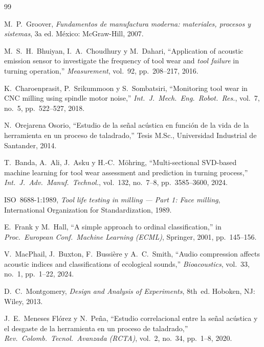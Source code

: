 \documentclass[10pt,twocolumn]{article}
\begin{document}
\begin{thebibliography}{99}

M.~P.~Groover, \textit{Fundamentos de manufactura moderna: materiales,
procesos y sistemas}, 3a ed. México: McGraw-Hill, 2007.

M.~S.~H.~Bhuiyan, I.~A.~Choudhury y M.~Dahari, ``Application of acoustic
emission sensor to investigate the frequency of tool wear and
\textit{tool failure} in turning operation,'' \textit{Measurement},
vol.~92, pp.~208--217, 2016.

K.~Charoenprasit, P.~Srikummoon y S.~Sombatsiri, ``Monitoring tool wear
in CNC milling using spindle motor noise,'' \textit{Int.\ J.\ Mech.\
Eng.\ Robot.\ Res.}, vol.~7, no.~5, pp.~522--527, 2018.

N.~Orejarena Osorio, ``Estudio de la señal acústica en función de la
vida de la herramienta en un proceso de taladrado,'' Tesis M.Sc.,
Universidad Industrial de Santander, 2014.

T.~Banda, A.~Ali, J.~Asku y H.-C.~Möhring, ``Multi-sectional SVD-based
machine learning for tool wear assessment and prediction in turning
process,'' \textit{Int.\ J.\ Adv.\ Manuf.\ Technol.}, vol.~132,
no.~7--8, pp.~3585--3600, 2024.

ISO~8688-1:1989, \textit{Tool life testing in milling --- Part 1: Face
milling}, International Organization for Standardization, 1989.

E.~Frank y M.~Hall, ``A simple approach to ordinal classification,'' in
\textit{Proc.\ European Conf.\ Machine Learning (ECML)}, Springer,
2001, pp.~145--156.

V.~MacPhail, J.~Buxton, F.~Bussière y A.~C.~Smith, ``Audio compression
affects acoustic indices and classifications of ecological sounds,''
\textit{Bioacoustics}, vol.~33, no.~1, pp.~1--22, 2024.

D.~C.~Montgomery, \textit{Design and Analysis of Experiments}, 8th~ed.
Hoboken, NJ: Wiley, 2013.

J.~E.~Meneses Flórez y N.~Peña, ``Estudio correlacional entre la señal
acústica y el desgaste de la herramienta en un proceso de taladrado,''
\textit{Rev.\ Colomb.\ Tecnol.\ Avanzada (RCTA)}, vol.~2, no.~34,
pp.~1--8, 2020.


\end{thebibliography}
\end{document}
